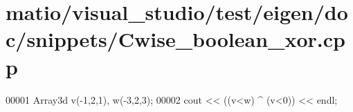 \hypertarget{matio_2visual__studio_2test_2eigen_2doc_2snippets_2_cwise__boolean__xor_8cpp_source}{}\section{matio/visual\+\_\+studio/test/eigen/doc/snippets/\+Cwise\+\_\+boolean\+\_\+xor.cpp}
\label{matio_2visual__studio_2test_2eigen_2doc_2snippets_2_cwise__boolean__xor_8cpp_source}

\begin{DoxyCode}
00001 Array3d v(-1,2,1), w(-3,2,3);
00002 cout << ((v<w) ^ (v<0)) << endl;
\end{DoxyCode}

